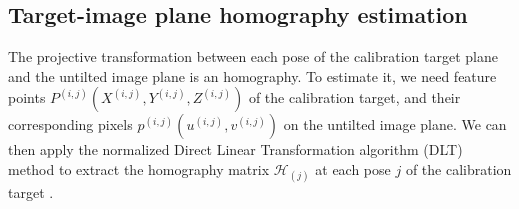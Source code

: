 \documentclass[12pt]{article}
\begin{document}
\subsection{Target-image plane homography estimation}
 The projective transformation between each pose of the calibration target plane and the untilted image plane is an homography. To estimate it, we need feature points $P^{(i,j)} ({X}^{(i,j)}, {Y}^{(i,j)}, {Z}^{(i,j)})$ of the calibration target, and their corresponding pixels ${p}^{(i,j)} ({u}^{(i,j)},{v}^{(i,j)})$ on the untilted image plane. We can then apply the normalized Direct Linear Transformation algorithm (DLT) method  to extract the homography matrix $\mathcal{H}_{(j)}$ at each pose $j$ of the calibration target \cite{Hartley:2003:MVG}.  \\
%
%
%
%
%
%
%
%
%
%
\end{document}
